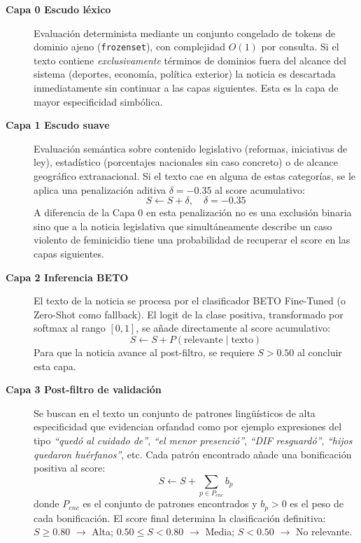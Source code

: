\begin{description}
    \item[\textbf{Capa 0 Escudo léxico}]
          Evaluación determinista mediante un conjunto congelado de tokens de dominio
          ajeno (\texttt{frozenset}), con complejidad $O(1)$ por consulta. Si el
          texto contiene \textit{exclusivamente} términos de dominios fuera del
          alcance del sistema (deportes, economía, política exterior) la noticia
          es descartada inmediatamente sin continuar a las capas siguientes. Esta
          es la capa de mayor especificidad simbólica.

    \item[\textbf{Capa 1 Escudo suave}]
          Evaluación semántica sobre contenido legislativo
          (reformas, iniciativas de ley), estadístico (porcentajes nacionales
          sin caso concreto) o de alcance geográfico extranacional. Si el texto
          cae en alguna de estas categorías, se le aplica una penalización aditiva
          $\delta = -0.35$ al score acumulativo:
          \begin{equation}
              S \leftarrow S + \delta, \quad \delta = -0.35
          \end{equation}
          A diferencia de la Capa 0 en esta penalización no es una exclusión binaria sino que
          a la noticia legislativa que simultáneamente describe un caso violento de feminicidio
          tiene una probabilidad de recuperar el score en las capas siguientes.

    \item[\textbf{Capa 2 Inferencia BETO}]
          El texto de la noticia se procesa por el clasificador BETO Fine-Tuned
          (o Zero-Shot como fallback). El logit de la clase positiva,
          transformado por softmax al rango $[0, 1]$, se añade directamente
          al score acumulativo:
          \begin{equation}
              S \leftarrow S + P(\text{relevante} \mid \text{texto})
          \end{equation}
          Para que la noticia avance al post-filtro, se requiere $S > 0.50$
          al concluir esta capa.

    \item[\textbf{Capa 3 Post-filtro de validación}]
          Se buscan en el texto un conjunto de patrones lingüísticos de alta
          especificidad que evidencian orfandad como por ejemplo expresiones del tipo
          \textit{``quedó al cuidado de''}, \textit{``el menor presenció''},
          \textit{``DIF resguardó''}, \textit{``hijos quedaron huérfanos''}, etc.
          Cada patrón encontrado añade una bonificación positiva al score:
          \begin{equation}
              S \leftarrow S + \sum_{p \in P_{enc}} b_p
          \end{equation}
          donde $P_{enc}$ es el conjunto de patrones encontrados y $b_p > 0$ es
          el peso de cada bonificación. El score final determina la clasificación
          definitiva: $S \geq 0.80$ \;$\rightarrow$\; Alta; $0.50 \leq S < 0.80$
          \;$\rightarrow$\; Media; $S < 0.50$ \;$\rightarrow$\; No relevante.
\end{description}

